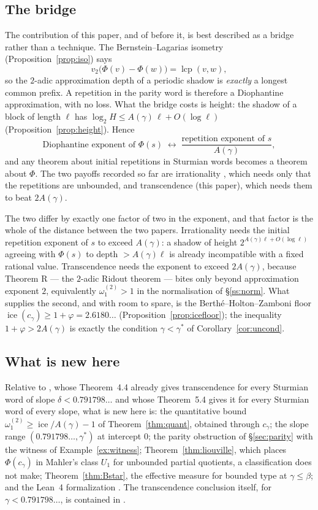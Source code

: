 \documentclass[11pt,reqno]{amsart}
\theoremstyle{plain}
\theoremstyle{definition}
\DeclareMathOperator{\lcp}{lcp}
\DeclareMathOperator{\ice}{ice}
\newcommand{\PH}{\Phi}
\newcommand{\gs}{\gamma^{*}}
\newcommand{\Av}{A(\gamma)}
\newcommand{\om}{\omega_1^{(2)}}
\newcommand{\vtwo}{v_2}
\begin{document}
\subsection{The bridge}\label{ss:bridge}
The contribution of this paper, and of \cite{DJirr} before it, is best described as a bridge rather
than a technique. The Bernstein--Lagarias isometry (Proposition~\ref{prop:iso}) says
\[
  \vtwo\bigl(\PH(v)-\PH(w)\bigr)=\lcp(v,w),
\]
so the $2$-adic approximation depth of a periodic shadow is \emph{exactly} a longest common prefix.
A repetition in the parity word is therefore a Diophantine approximation, with no loss. What the
bridge costs is height: the shadow of a block of length $\ell$ has
$\log_2 H\le\Av\,\ell+O(\log\ell)$ (Proposition~\ref{prop:height}). Hence
\[
  \text{Diophantine exponent of }\PH(s)\;\longleftrightarrow\;
  \frac{\text{repetition exponent of }s}{\Av},
\]
and any theorem about initial repetitions in Sturmian words becomes a theorem about $\PH$. The two
payoffs recorded so far are irrationality \cite{DJirr}, which needs only that the repetitions are
unbounded, and transcendence (this paper), which needs them to beat $2\Av$.

The two differ by exactly one factor of two in the exponent, and that factor is the whole of the
distance between the two papers. Irrationality \cite[\S10]{DJirr} needs the initial repetition
exponent of $s$ to exceed $\Av$: a shadow of height $2^{\Av\ell+O(\log\ell)}$ agreeing with
$\PH(s)$ to depth $>\Av\ell$ is already incompatible with a fixed rational value. Transcendence
needs the exponent to exceed $2\Av$, because Theorem R --- the $2$-adic Ridout theorem --- bites
only beyond approximation exponent $2$, equivalently $\om>1$ in the normalisation of
\S\ref{ss:norm}. What supplies the second, and with room to spare, is the
Berth\'e--Holton--Zamboni floor $\ice(c_\gamma)\ge1+\varphi=2.6180\ldots$
(Proposition~\ref{prop:icefloor}); the inequality $1+\varphi>2\Av$ is exactly the condition
$\gamma<\gs$ of Corollary~\ref{cor:uncond}.

\subsection{What is new here}
Relative to \cite{Allikvere26}, whose Theorem~4.4 already gives transcendence for every Sturmian
word of slope $\delta<0.791798\ldots$ and whose Theorem~5.4 gives it for every Sturmian word of
every slope, what is new here is: the quantitative bound $\om\ge\ice/\Av-1$ of
Theorem~\ref{thm:quant}, obtained through $c_\gamma$; the slope range $(0.791798\ldots,\gs)$ at
intercept $0$; the parity obstruction of \S\ref{sec:parity} with the witness of
Example~\ref{ex:witness}; Theorem~\ref{thm:liouville}, which places $\PH(c_\gamma)$ in Mahler's
class $U_1$ for unbounded partial quotients, a classification \cite{Allikvere26} does not make;
Theorem~\ref{thm:Bstar}, the effective measure for bounded type at $\gamma\le\beta$; and the
Lean~4 formalization \cite{DJlean}. The transcendence conclusion itself, for
$\gamma<0.791798\ldots$, is contained in \cite[Theorem 4.4]{Allikvere26}.
\end{document}
